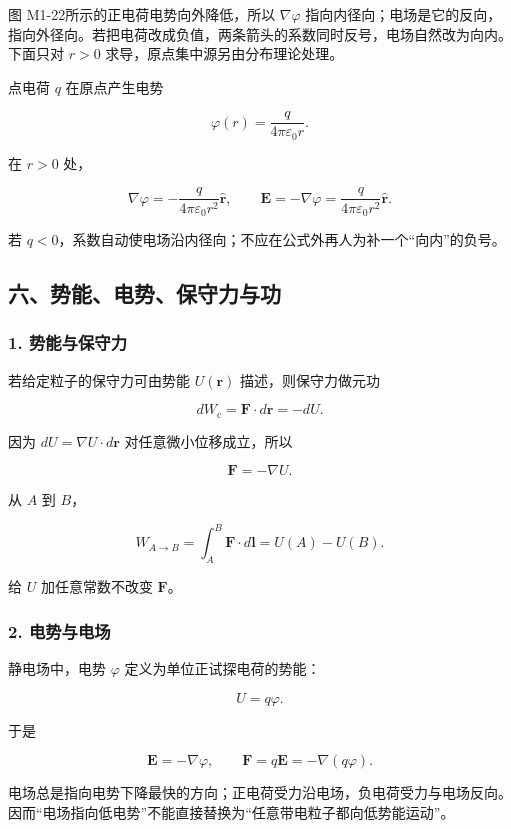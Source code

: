 图 M1-22所示的正电荷电势向外降低，所以 \(\nabla\varphi\)
指向内径向；电场是它的反向，指向外径向。若把电荷改成负值，两条箭头的系数同时反号，电场自然改为向内。下面只对
\(r>0\) 求导，原点集中源另由分布理论处理。

点电荷 \(q\) 在原点产生电势

\[
\varphi(r)=\frac{q}{4\pi\varepsilon_0r}.
\]

在 \(r>0\) 处，

\[
\nabla\varphi
=-\frac{q}{4\pi\varepsilon_0r^2}\hat{\mathbf r},
\qquad
\mathbf E=-\nabla\varphi
=\frac{q}{4\pi\varepsilon_0r^2}\hat{\mathbf r}.
\]

若
\(q<0\)，系数自动使电场沿内径向；不应在公式外再人为补一个``向内''的负号。

\subsection{六、势能、电势、保守力与功}\label{m1:ux516dux52bfux80fdux7535ux52bfux4fddux5b88ux529bux4e0eux529f}

\subsubsection{1.
势能与保守力}\label{m1:ux52bfux80fdux4e0eux4fddux5b88ux529b}

若给定粒子的保守力可由势能 \(U(\mathbf r)\) 描述，则保守力做元功

\[
dW_{\mathrm c}=\mathbf F\cdot d\mathbf r=-dU.
\]

因为 \(dU=\nabla U\cdot d\mathbf r\) 对任意微小位移成立，所以

\[
\boxed{
\mathbf F=-\nabla U
}.
\]

从 \(A\) 到 \(B\)，

\[
W_{A\to B}
=\int_A^B\mathbf F\cdot d\mathbf l
=U(A)-U(B).
\]

给 \(U\) 加任意常数不改变 \(\mathbf F\)。

\subsubsection{2. 电势与电场}\label{m1:ux7535ux52bfux4e0eux7535ux573a}

静电场中，电势 \(\varphi\) 定义为单位正试探电荷的势能：

\[
U=q\varphi.
\]

于是

\[
\boxed{
\mathbf E=-\nabla\varphi,
\qquad
\mathbf F=q\mathbf E=-\nabla(q\varphi)
}.
\]

电场总是指向电势下降最快的方向；正电荷受力沿电场，负电荷受力与电场反向。因而``电场指向低电势''不能直接替换为``任意带电粒子都向低势能运动''。

